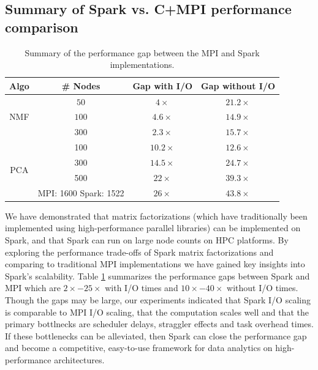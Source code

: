 \subsection{Summary of Spark vs. C+MPI performance comparison}
 \begin{table}[t]
\begin{center}
\begin{tabular}{|c|c|c|c|} \hline
Algo & \# Nodes & Gap with I/O & Gap without I/O\\ \hline
\multirow{3}{*}{NMF} & $50$ & $4\times$ & $21.2 \times$\\
{} & $100$  & $4.6\times$ & $14.9\times$\\
{} & $300$ & $2.3\times$ & $15.7\times$\\ \hline
\multirow{4}{*}{PCA} & 100 & $10.2\times$ & $12.6\times$\\
 {} & 300 & $14.5\times$ & $24.7\times$\\
 {} & 500 & $22\times$ & $39.3\times$\\ \cline{2-4}
 {} & {MPI: 1600 Spark: 1522} & $26\times$ & $43.8\times$\\ \hline
\end{tabular}
\end{center}
\caption{Summary of the performance gap between the MPI and Spark implementations.}
\label{tab:perfgaps}
\end{table}
We have demonstrated that matrix factorizations (which have traditionally been implemented using high-performance parallel libraries) can be implemented on Spark, and that Spark can run on large node counts on HPC platforms. By exploring the performance trade-offs of Spark matrix factorizations and comparing to traditional MPI implementations we have gained key insights into Spark's scalability. Table \ref{tab:perfgaps} summarizes the performance gaps between Spark and MPI which are $2\times - 25\times$ with I/O times and $10\times - 40\times$ without I/O times. Though the gaps may be large, our experiments indicated that Spark I/O scaling is comparable to MPI I/O scaling, that the computation scales well and that the primary bottlnecks are scheduler delays, straggler effects and task overhead times. If these bottlenecks can be alleviated, then Spark can close the performance gap and become a competitive, easy-to-use framework for data analytics on high-performance architectures.   
        
